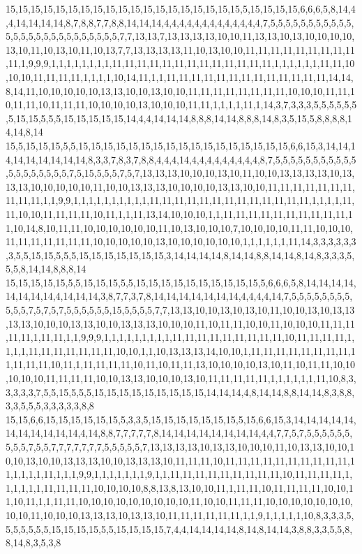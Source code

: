 15,15,15,15,15,15,15,15,15,15,15,15,15,15,15,15,15,15,15,5,15,15,15,15,6,6,6,5,8,14,4,4,14,14,14,14,8,7,8,8,7,7,8,8,14,14,14,4,4,4,4,4,4,4,4,4,4,4,4,4,7,5,5,5,5,5,5,5,5,5,5,5,5,5,5,5,5,5,5,5,5,5,5,5,5,5,5,7,7,13,13,7,13,13,13,13,10,10,11,13,13,10,13,10,10,10,10,13,10,11,10,13,10,11,10,13,7,7,13,13,13,13,11,10,13,10,10,11,11,11,11,11,11,11,11,11,11,1,9,9,9,1,1,1,1,1,1,1,1,11,11,11,11,11,11,11,11,11,11,11,11,11,1,1,1,1,1,1,11,11,10,10,10,11,11,11,11,1,1,1,1,10,14,11,1,1,11,11,11,11,11,11,11,11,11,11,11,11,11,14,14,8,14,11,10,10,10,10,10,13,13,10,10,13,10,10,11,11,11,11,11,11,11,11,10,10,10,11,11,10,11,11,10,11,11,11,10,10,10,10,13,10,10,10,11,11,1,1,1,1,11,1,14,3,7,3,3,3,5,5,5,5,5,5,5,15,15,5,5,5,15,15,15,15,15,14,4,4,14,14,14,8,8,8,14,14,8,8,8,14,8,3,5,15,5,8,8,8,8,14,14,8,14
15,5,15,15,15,5,5,15,15,15,15,15,15,15,15,15,15,15,15,15,15,15,15,15,6,6,15,3,14,14,14,14,14,14,14,14,14,8,3,3,7,8,3,7,8,8,4,4,4,14,4,4,4,4,4,4,4,4,4,8,7,5,5,5,5,5,5,5,5,5,5,5,5,5,5,5,5,5,5,5,7,5,15,5,5,5,7,5,7,13,13,13,10,10,10,13,10,11,10,10,13,13,13,13,10,13,13,13,10,10,10,10,10,11,10,10,13,13,13,10,10,10,10,13,13,10,10,11,11,11,11,11,11,11,11,11,11,1,1,9,9,1,1,1,1,1,1,1,1,1,1,11,11,11,11,11,11,11,11,11,11,11,11,11,1,1,1,1,11,11,10,10,11,11,11,11,10,11,1,1,11,13,14,10,10,10,1,1,11,11,11,11,11,11,11,11,11,11,11,10,14,8,10,11,11,10,10,10,10,10,10,11,10,13,10,10,10,7,10,10,10,10,11,11,10,10,10,11,11,11,11,11,11,11,10,10,10,10,10,13,10,10,10,10,10,10,1,1,1,1,1,1,11,14,3,3,3,3,3,3,3,5,5,15,15,5,5,5,15,15,15,15,15,15,15,3,14,14,14,14,8,14,14,8,8,14,14,8,14,8,3,3,3,5,5,5,8,14,14,8,8,8,14
15,15,15,15,15,5,5,15,15,15,5,5,15,15,15,15,15,15,15,15,15,15,5,6,6,6,5,8,14,14,14,14,14,14,14,14,4,14,14,14,3,8,7,7,3,7,8,14,14,14,14,14,14,14,4,4,4,4,14,7,5,5,5,5,5,5,5,5,5,5,5,7,5,7,5,7,5,5,5,5,5,5,15,5,5,5,5,7,7,13,13,10,10,13,10,13,10,11,10,10,13,10,13,13,13,13,10,10,10,13,13,10,10,13,13,13,10,10,10,11,10,11,11,10,10,11,10,10,10,11,11,11,11,11,1,11,11,1,1,9,9,9,1,1,1,1,1,1,1,1,1,11,11,11,11,11,11,11,11,11,10,11,11,11,11,1,1,1,1,11,11,11,11,11,11,11,10,10,1,1,10,13,13,13,14,10,10,1,11,11,11,11,11,11,11,11,11,11,11,11,10,11,1,11,11,11,11,10,11,10,11,11,13,10,10,10,10,13,10,11,10,11,11,10,10,10,10,10,11,11,11,11,10,10,13,13,10,10,10,13,10,11,11,11,11,11,1,1,1,1,1,1,11,10,8,3,3,3,3,3,7,5,5,15,5,5,5,15,15,15,15,15,15,15,15,15,14,14,14,4,8,14,14,8,8,14,14,8,3,8,8,3,3,5,5,5,3,3,3,3,3,8,8
15,15,6,6,15,15,15,15,15,15,5,3,3,5,15,15,15,15,15,15,15,5,15,6,6,15,3,14,14,14,14,14,14,14,14,14,14,14,4,14,8,8,7,7,7,7,7,8,14,14,14,14,14,14,14,14,4,4,7,7,5,7,5,5,5,5,5,5,5,5,5,7,5,5,7,7,7,7,7,7,7,5,5,5,5,5,7,13,13,13,13,10,13,13,10,10,10,11,10,13,13,10,10,10,10,13,10,10,13,13,13,10,10,13,13,13,10,11,11,11,10,11,11,11,11,11,11,11,11,11,11,11,1,1,1,1,11,1,1,1,9,9,1,1,1,1,1,1,1,9,1,1,11,11,11,11,11,11,11,11,11,10,11,11,11,11,1,1,1,1,1,1,11,11,11,11,10,10,10,10,8,8,13,8,13,10,10,11,1,11,11,10,11,11,11,11,10,10,11,10,11,1,1,11,11,10,10,10,10,10,10,10,10,10,11,10,10,11,11,11,10,10,10,10,10,10,10,10,10,11,10,10,10,13,13,13,10,13,13,10,11,11,11,11,11,11,1,1,9,1,1,1,1,1,10,8,3,3,3,5,5,5,5,5,5,5,15,15,15,15,5,5,15,15,15,15,7,4,4,14,14,14,14,8,14,8,14,14,3,8,8,3,3,5,5,8,8,14,8,3,5,3,8
